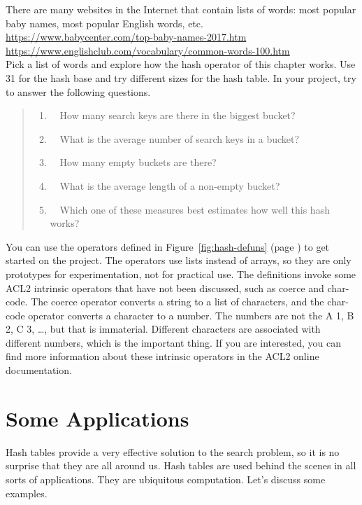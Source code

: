 \begin{ExerciseList}
\Exercise There are many websites in the Internet that contain lists of words:
most popular baby names, most popular English words, etc.\\
\hspace*{1cm}\url{https://www.babycenter.com/top-baby-names-2017.htm} \\
\hspace*{1cm}\url{https://www.englishclub.com/vocabulary/common-words-100.htm}\\
Pick a list of words and explore how the hash operator of this chapter works.
Use 31 for the hash base and try different sizes for the hash table.
In your project, try to answer the following questions.
\begin{quote}
\begin{enumerate}
\item ~~How many search keys are there in the biggest bucket?
\item ~~What is the average number of search keys in a bucket?
\item ~~How many empty buckets are there?
\item ~~What is the average length of a non-empty bucket?
\item ~~Which one of these measures best estimates how well this hash works?
\end{enumerate}
\end{quote}
You can use the operators defined in
Figure~\ref{fig:hash-defuns} (page \pageref{fig:hash-defuns})
to get started on the project.
The operators use lists instead of arrays, so they are only  prototypes
for experimentation, not for practical use.
The definitions invoke some ACL2 intrinsic operators
that have not been discussed, such as
\textsf{coerce} and \textsf{char-code}.
The \textsf{coerce} operator converts a string to a list of characters,
and the char-code operator converts a character to a number.
The numbers are not the A 1, B 2, C 3, \dots, but that is immaterial.
Different characters are associated with different numbers,
which is the important thing. If you are interested,
you can find more information about these intrinsic
operators in the ACL2 online documentation.
\end{ExerciseList}

\section{Some Applications}

Hash tables provide a very effective solution to the search problem,
so it is no surprise that they are all around us.
Hash tables are used behind the scenes in all sorts of applications.
They are ubiquitous computation.
Let's discuss some examples.

